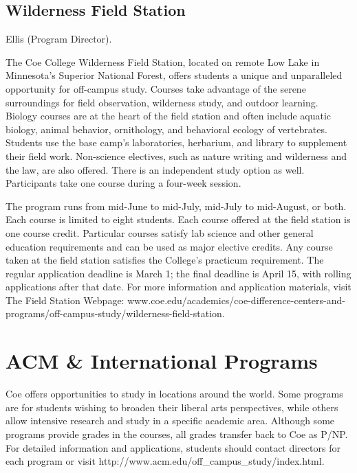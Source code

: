 \documentclass[
  letterpaper,
]{scrbook}
\begin{document}
\hypertarget{wilderness-field-station}{%
\subsection{Wilderness Field Station}\label{wilderness-field-station}}

Ellis (Program Director).

The Coe College Wilderness Field Station, located on remote Low Lake in
Minnesota's Superior National Forest, offers students a unique and
unparalleled opportunity for off-campus study. Courses take advantage of
the serene surroundings for field observation, wilderness study, and
outdoor learning. Biology courses are at the heart of the field station
and often include aquatic biology, animal behavior, ornithology, and
behavioral ecology of vertebrates. Students use the base camp's
laboratories, herbarium, and library to supplement their field work.
Non-science electives, such as nature writing and wilderness and the
law, are also offered. There is an independent study option as well.
Participants take one course during a four-week session.

The program runs from mid-June to mid-July, mid-July to mid-August, or
both. Each course is limited to eight students. Each course offered at
the field station is one course credit. Particular courses satisfy lab
science and other general education requirements and can be used as
major elective credits. Any course taken at the field station satisfies
the College's practicum requirement. The regular application deadline is
March 1; the final deadline is April 15, with rolling applications after
that date. For more information and application materials, visit The
Field Station Webpage:
www.coe.edu/academics/coe-difference-centers-and-programs/off-campus-study/wilderness-field-station.

\hypertarget{acm-international-programs}{%
\section{ACM \& International
Programs}\label{acm-international-programs}}

Coe offers opportunities to study in locations around the world. Some
programs are for students wishing to broaden their liberal arts
perspectives, while others allow intensive research and study in a
specific academic area. Although some programs provide grades in the
courses, all grades transfer back to Coe as P/NP. For detailed
information and applications, students should contact directors for each
program or visit http://www.acm.edu/off\_campus\_study/index.html.
\end{document}
